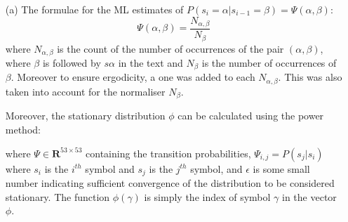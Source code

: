\documentclass[12pt]{article}
\begin{document}
\begin{enumerate}

%
%
%
%


\item[(a)] The formulae for the ML estimates of $P(s_i = \alpha |s_{i-1} = \beta) = \Psi(\alpha, \beta)$:
$$\Psi(\alpha, \beta) = \frac{N_{\alpha, \beta}}{N_{\beta}}$$
where $N_{\alpha, \beta}$ is the count of the number of occurrences of the pair $(\alpha, \beta)$, where $\beta$ is followed by $s\alpha$ in the text and $N_{\beta}$ is the number of occurrences of $\beta$. Moreover to ensure ergodicity, a one was added to each $N_{\alpha, \beta}$. This was also taken into account for the normaliser $N_{\beta}$.

Moreover, the stationary distribution $\phi$ can be calculated using the power method:
\begin{enumerate}
  \item[(i)] Initialise any $\phi^{(0)} \in \mathbb{R}^{53 \times 1}$ and $\sum_i \phi^{(0)}_i = 1$
  \item[(ii)] Repeat $\phi^{(i+1)} = \Psi \phi^{(i)}$
  \item[(iii)] Terminate when $\phi^{(i+1) - \phi^{(i)} < \epsilon$
\end{enumerate}

where $\Psi \in \mathbf{R}^{53\times53}$ containing the transition probabilities, $\Psi_{i, j} = P(s_j | s_i)$ where $s_i$ is the $i^{th}$ symbol and $s_j$ is the $j^{th}$ symbol, and $\epsilon$ is some small number indicating sufficient convergence of the distribution to be considered stationary. The function $\phi(\gamma)$ is simply the index of symbol $\gamma$ in the vector $\phi$.


\end{enumerate}
\end{document}
